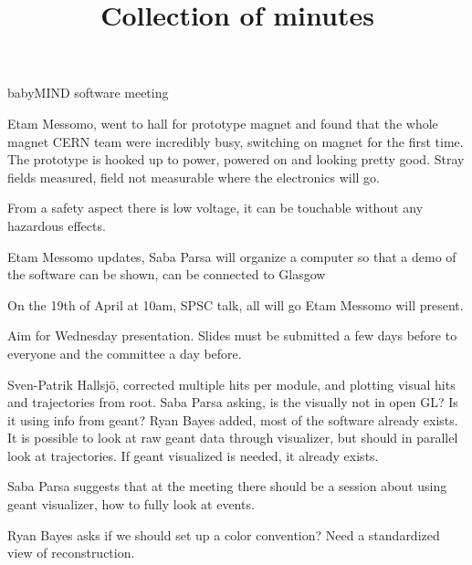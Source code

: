 \documentclass{article}
\title{Collection of minutes}
\author{\LaTeXe}
\begin{document}
\begin{Minutes}{babyMIND software meeting}

\maketitle

Etam Messomo, went to hall for prototype magnet and found that the whole magnet CERN team were incredibly busy, switching on magnet for the first time. The prototype is hooked up to power, powered on and looking pretty good. 
Stray fields measured, field not measurable where the electronics will go.

From a safety aspect there is low voltage, it can be touchable without any hazardous effects.

Etam Messomo updates, Saba Parsa will organize a computer so that a demo of the software can be shown, can be connected to Glasgow

On the 19th of April at 10am, SPSC talk, all will go Etam Messomo will present.


Aim for Wednesday presentation. Slides must be submitted a few days before to everyone and the committee a day before.

Sven-Patrik Hallsj\"o, corrected multiple hits per module, and plotting visual hits and trajectories from root.
Saba Parsa asking, is the visually not in open GL? Is it using info from geant?
Ryan Bayes added, most of the software already exists. It is possible to look at raw geant data through visualizer, but should in parallel look at trajectories. If geant visualized is needed, it already exists.

Saba Parsa suggests that at the meeting there should be a session about using geant visualizer, how to fully look at events. 

Ryan Bayes asks if we should set up a color convention? Need a standardized view of reconstruction.


\end{Minutes}
\end{document}
